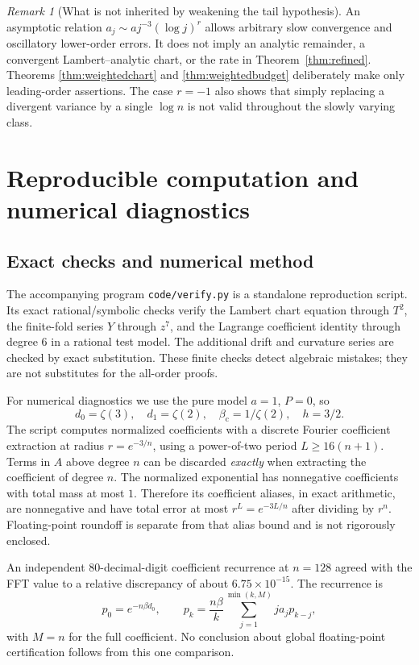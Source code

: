 \documentclass[11pt,a4paper]{article}
\numberwithin{equation}{section}
\theoremstyle{definition}
\theoremstyle{remark}
\newtheorem{remark}[theorem]{Remark}
\newcommand{\bc}{\beta_{\mathrm c}}
\begin{document}
\begin{remark}[What is not inherited by weakening the tail hypothesis]
An asymptotic relation $a_j\sim a j^{-3}(\log j)^r$ allows arbitrary
slow convergence and oscillatory lower-order errors. It does not imply
an analytic remainder, a convergent Lambert--analytic chart, or the
rate in Theorem~\ref{thm:refined}. Theorems
\ref{thm:weightedchart} and \ref{thm:weightedbudget} deliberately make
only leading-order assertions. The case $r=-1$ also shows that simply
replacing a divergent variance by a single $\log n$ is not valid
throughout the slowly varying class.
\end{remark}

\section{Reproducible computation and numerical diagnostics}
\label{sec:computation}

\subsection{Exact checks and numerical method}
The accompanying program \texttt{code/verify.py} is a standalone
reproduction script. Its exact rational/symbolic checks verify the
Lambert chart equation through $T^2$, the finite-fold series $Y$ through
$z^7$, and the Lagrange coefficient identity through degree $6$ in a
rational test model. The additional drift and curvature series are
checked by exact substitution. These finite checks detect algebraic
mistakes; they are not substitutes for the all-order proofs.

For numerical diagnostics we use the pure model $a=1$, $P=0$, so
\[
 d_0=\zeta(3),\quad d_1=\zeta(2),\quad \bc=1/\zeta(2),\quad h=3/2.
\]
The script computes normalized coefficients with a discrete Fourier
coefficient extraction at radius $r=e^{-3/n}$, using a power-of-two
period $L\ge16(n+1)$. Terms in $A$ above degree $n$ can be discarded
\emph{exactly} when extracting the coefficient of degree $n$.
The normalized exponential has nonnegative coefficients with total
mass at most $1$. Therefore its coefficient aliases, in exact arithmetic,
are nonnegative and have total error at most $r^L=e^{-3L/n}$ after
dividing by $r^n$. Floating-point roundoff is separate from that alias
bound and is not rigorously enclosed.

An independent 80-decimal-digit coefficient recurrence at $n=128$
agreed with the FFT value to a relative discrepancy of about
$6.75\times10^{-15}$. The recurrence is
\begin{equation}\label{eq:coeffrecurrence}
 p_0=e^{-n\beta d_0},\qquad
 p_k=\frac{n\beta}{k}\sum_{j=1}^{\min(k,M)}j a_jp_{k-j},
\end{equation}
with $M=n$ for the full coefficient. No conclusion about global
floating-point certification follows from this one comparison.
\end{document}
